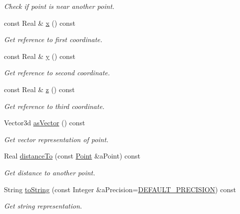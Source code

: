 \begin{DoxyCompactItemize}
\begin{DoxyCompactList}\small\item\em Check if point is near another point. \end{DoxyCompactList}\item 
const Real \& \hyperlink{classostk_1_1math_1_1geom_1_1d3_1_1objects_1_1_point_a68a5204a2ca259486a1c1e442c833203}{x} () const
\begin{DoxyCompactList}\small\item\em Get reference to first coordinate. \end{DoxyCompactList}\item 
const Real \& \hyperlink{classostk_1_1math_1_1geom_1_1d3_1_1objects_1_1_point_a77c908e2091fa581f8e975824dbe4f22}{y} () const
\begin{DoxyCompactList}\small\item\em Get reference to second coordinate. \end{DoxyCompactList}\item 
const Real \& \hyperlink{classostk_1_1math_1_1geom_1_1d3_1_1objects_1_1_point_a16b88664b655d69c146421dfb75bc246}{z} () const
\begin{DoxyCompactList}\small\item\em Get reference to third coordinate. \end{DoxyCompactList}\item 
Vector3d \hyperlink{classostk_1_1math_1_1geom_1_1d3_1_1objects_1_1_point_a00034296a5aab3bcc8c4fe46584f119a}{as\+Vector} () const
\begin{DoxyCompactList}\small\item\em Get vector representation of point. \end{DoxyCompactList}\item 
Real \hyperlink{classostk_1_1math_1_1geom_1_1d3_1_1objects_1_1_point_a17c835ac01d24fb703eee44191331ee7}{distance\+To} (const \hyperlink{classostk_1_1math_1_1geom_1_1d3_1_1objects_1_1_point}{Point} \&a\+Point) const
\begin{DoxyCompactList}\small\item\em Get distance to another point. \end{DoxyCompactList}\item 
String \hyperlink{classostk_1_1math_1_1geom_1_1d3_1_1objects_1_1_point_a86208d5df1931b6d847e74dd99406e70}{to\+String} (const Integer \&a\+Precision=\hyperlink{3_d_2_objects_2_point_8hpp_a6d81881a7883657dbc659ca545d9085d}{D\+E\+F\+A\+U\+L\+T\+\_\+\+P\+R\+E\+C\+I\+S\+I\+ON}) const
\begin{DoxyCompactList}\small\item\em Get string representation. \end{DoxyCompactList}\item 

\end{DoxyCompactItemize}
